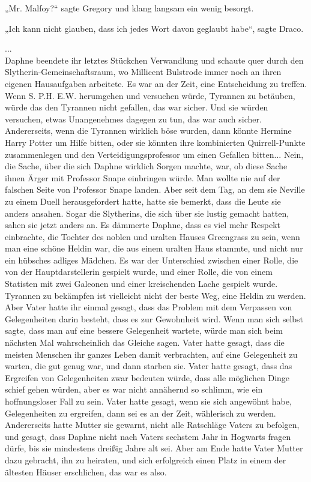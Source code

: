{„Mr. Malfoy?“ sagte Gregory und klang langsam ein wenig besorgt.

„Ich kann nicht glauben, dass ich jedes Wort davon geglaubt habe“, sagte Draco.

...\\ Daphne beendete ihr letztes Stückchen Verwandlung und schaute quer durch den Slytherin-Gemeinschaftsraum, wo Millicent Bulstrode immer noch an ihren eigenen Hausaufgaben arbeitete. Es war an der Zeit, eine Entscheidung zu treffen. Wenn S. P.H. E.W. herumgehen und versuchen würde, Tyrannen zu betäuben, würde das den Tyrannen nicht gefallen, das war sicher. Und sie würden versuchen, etwas Unangenehmes dagegen zu tun, das war auch sicher. Andererseits, wenn die Tyrannen wirklich böse wurden, dann könnte Hermine Harry Potter um Hilfe bitten, oder sie könnten ihre kombinierten Quirrell-Punkte zusammenlegen und den Verteidigungsprofessor um einen Gefallen bitten... Nein, die Sache, über die sich Daphne wirklich Sorgen machte, war, ob diese Sache ihnen Ärger mit Professor Snape einbringen würde. Man wollte nie auf der falschen Seite von Professor Snape landen. Aber seit dem Tag, an dem sie Neville zu einem Duell herausgefordert hatte, hatte sie bemerkt, dass die Leute sie anders ansahen. Sogar die Slytherins, die sich über sie lustig gemacht hatten, sahen sie jetzt anders an. Es dämmerte Daphne, dass es viel mehr Respekt einbrachte, die Tochter des noblen und uralten Hauses Greengrass zu sein, wenn man eine schöne Heldin war, die aus einem uralten Haus stammte, und nicht nur ein hübsches adliges Mädchen. Es war der Unterschied zwischen einer Rolle, die von der Hauptdarstellerin gespielt wurde, und einer Rolle, die von einem Statisten mit zwei Galeonen und einer kreischenden Lache gespielt wurde. Tyrannen zu bekämpfen ist vielleicht nicht der beste Weg, eine Heldin zu werden. Aber Vater hatte ihr einmal gesagt, dass das Problem mit dem Verpassen von Gelegenheiten darin besteht, dass es zur Gewohnheit wird. Wenn man sich selbst sagte, dass man auf eine bessere Gelegenheit wartete, würde man sich beim nächsten Mal wahrscheinlich das Gleiche sagen. Vater hatte gesagt, dass die meisten Menschen ihr ganzes Leben damit verbrachten, auf eine Gelegenheit zu warten, die gut genug war, und dann starben sie. Vater hatte gesagt, dass das Ergreifen von Gelegenheiten zwar bedeuten würde, dass alle möglichen Dinge schief gehen würden, aber es war nicht annähernd so schlimm, wie ein hoffnungsloser Fall zu sein. Vater hatte gesagt, wenn sie sich angewöhnt habe, Gelegenheiten zu ergreifen, dann sei es an der Zeit, wählerisch zu werden. Andererseits hatte Mutter sie gewarnt, nicht alle Ratschläge Vaters zu befolgen, und gesagt, dass Daphne nicht nach Vaters sechstem Jahr in Hogwarts fragen dürfe, bis sie mindestens dreißig Jahre alt sei. Aber am Ende hatte Vater Mutter dazu gebracht, ihn zu heiraten, und sich erfolgreich einen Platz in einem der ältesten Häuser erschlichen, das war es also.

}
